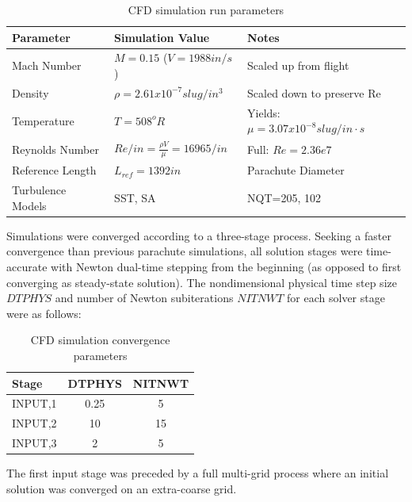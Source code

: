 \documentclass[]{aiaa-tc}%
\begin{document}
\begin{table}[htb]
\begin{center}
\begin{tabular}{| l | l | l |}
\hline
\textbf{Parameter} &  \textbf{Simulation Value} & \textbf{Notes} \\
\hline
Mach Number   &  $M=0.15$ ($V=1988in/s$) & Scaled up from flight      \\
Density &  $\rho=2.61x10^{-7}slug/in^3$ & Scaled down to preserve Re       \\
Temperature  &  $T=508^oR$ & Yields: $\mu=3.07x10^{-8}slug/in\cdot s$ \\
Reynolds Number  &  $Re/in=\frac{\rho V}{\mu}=16965/in$ & Full: $Re=2.36e7$\\
Reference Length  &  $L_{ref}=1392in$ & Parachute Diameter \\
Turbulence Models  &  SST, SA           & NQT=205, 102 \\
\hline
\end{tabular}
\end{center}
\caption{CFD simulation run parameters}
\end{table}

Simulations were converged according to a three-stage process.  Seeking a faster convergence than previous parachute simulations, all solution stages were time-accurate with Newton dual-time stepping from the beginning (as opposed to first converging as steady-state solution).  The nondimensional physical time step size $DTPHYS$ and number of Newton subiterations $NITNWT$ for each solver stage were as follows:

\begin{table}[htb]
\begin{center}
\begin{tabular}{| l | c | c |}
\hline
\textbf{Stage} &  \textbf{DTPHYS} & \textbf{NITNWT} \\
\hline
INPUT,1   &  0.25 & 5      \\
INPUT,2   &  10 & 15      \\
INPUT,3   &  2 & 5      \\
\hline
\end{tabular}
\end{center}
\caption{CFD simulation convergence parameters}
\end{table}

The first input stage was preceded by a full multi-grid process where an initial solution was converged on an extra-coarse grid.
\end{document}
